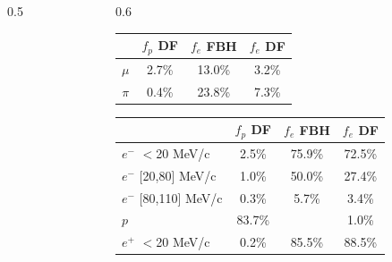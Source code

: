 \documentclass{beamer}
\begin{document}
\begin{frame}
\begin{columns}
\begin{column}{0.5\framewidth}
\begin{itemize}
{    }
\end{itemize}
        \end{column}
         \begin{column}{0.6\framewidth}
        \begin{table}[h!]
        \centering
        \hspace*{-0.5em}
        \renewcommand{\arraystretch}{0.7}
        \begin{tabular}{| c | c | c | c|} 
        \hline
         &  {\scriptsize $f_{p}$ DF} &  {\scriptsize $f_{e}$ FBH} & {\scriptsize $f_{e}$ DF}\\
        \hline
        {\scriptsize $\mu$} &  {\scriptsize 2.7\%}  & {\scriptsize 13.0\%} & {\scriptsize 3.2\%}\\
        \hline
        {\scriptsize $\pi$} & {\scriptsize 0.4\%} & {\scriptsize 23.8\%} & {\scriptsize 7.3\%} \\
        \hline
        \end{tabular}
        \label{tab:0bbpbar}
        \end{table}
        \vspace{-6mm}
        \begin{table}[h!]
    \centering
            \hspace*{-0.5em}
    \renewcommand{\arraystretch}{0.7}
    \begin{tabular}{| l | c | c | c |} 
    \hline
    &    {\scriptsize $f_{p}$ DF} & {\scriptsize $f_{e}$ FBH } & {\scriptsize $f_{e}$ DF} \\
    \hline
    {\scriptsize $e^-$} {\tiny$<$20 MeV/c}      & {\scriptsize 2.5\%}   & {\scriptsize 75.9\%} & {\scriptsize 72.5\%}\\
    \hline
    {\scriptsize $e^-$} {\tiny[20,80] MeV/c}  & {\scriptsize 1.0\%}   & {\scriptsize 50.0\%} & {\scriptsize 27.4\%} \\
    \hline
    {\scriptsize $e^-$} {\tiny[80,110] MeV/c}  & {\scriptsize 0.3\%}  &  {\scriptsize 5.7\%} & {\scriptsize 3.4\%}\\
    \hline
    {\scriptsize $p$}       &         {\scriptsize 83.7\%}   &  & {\scriptsize 1.0\%}\\
    \hline
    {\scriptsize $e^+$} {\tiny$<$20 MeV/c} & {\scriptsize 0.2\%}    &   {\scriptsize 85.5\%}& {\scriptsize 88.5\%}\\
    \hline

    \end{tabular}
    \label{tab:2bbcele}
    \end{table}
  

\end{column}
\end{columns}
\end{frame}
\end{document}
